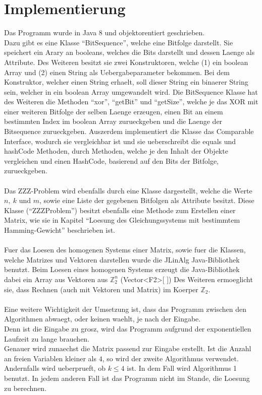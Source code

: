\documentclass[a4paper,10pt,ngerman]{scrartcl}
\begin{document}
{\section{Implementierung}
Das Programm wurde in Java 8 und objektorentiert geschrieben.
\\ Dazu gibt es eine Klasse "`BitSequence"', welche eine Bitfolge darstellt. Sie speichert ein Arary an booleans, welches die Bits darstellt und dessen Laenge als Attribute. 
Des Weiteren besitzt sie zwei Konstruktoren, welche (1) ein boolean Array und (2) einen String als Uebergabeparameter bekommen. Bei dem Konstruktor, welcher einen String erhaelt, soll dieser String ein binaerer String sein, welcher in ein boolean Array umgewandelt wird.
Die BitSequence Klasse hat des Weiteren die Methoden "`xor"', "`getBit"' und "`getSize"', welche je das XOR mit einer weiteren Bitfolge der selben Laenge erzeugen, einen Bit an einem bestimmten Index im boolean Array zurueckgeben und die Laenge der Bitsequence zurueckgeben. Auszerdem implementiert die Klasse das Comparable Interface, wodurch sie vergleichbar ist und sie ueberschreibt die equals und hashCode Methoden, durch Methoden, welche je den Inhalt der Objekte vergleichen und einen HashCode, basierend auf den Bits der Bitfolge, zurueckgeben.
\\\\
Das ZZZ-Problem wird ebenfalls durch eine Klasse dargestellt, welche die Werte $n, \ k$ und $m$, sowie eine Liste der gegebenen Bitfolgen als Attribute besitzt. Diese Klasse ("`ZZZProblem"') besitzt ebenfalls eine Methode zum Erstellen einer Matrix, wie sie in Kapitel "`Loesung des Gleichungssystems mit bestimmtem Hamming-Gewicht"' beschrieben ist.
\\\\
Fuer das Loesen des homogenen Systems einer Matrix, sowie fuer die Klassen, welche Matrizes und Vektoren darstellen wurde die JLinAlg Java-Bibliothek benutzt. 
Beim Loesen eines homogenen Systems erzeugt die Java-Bibliothek dabei ein Array aus Vektoren aus \(\mathbb{Z}_{2}^n\) (Vector<F2>[ ])
Des Weiteren ermoeglicht sie, dass Rechnen (auch mit Vektoren und Matrix) im Koerper \(\mathbb{Z}_{2}\). 
\\\\
Eine weitere Wichtigkeit der Umsetzung ist, dass das Programm zwischen den Algorithmen abwaegt, oder keinen waehlt, je nach der Eingabe.\\
Denn ist die Eingabe zu grosz, wird das Programm aufgrund der exponentiellen Laufzeit zu lange brauchen. \\
Genauer wird zunaechst die Matrix passend zur Eingabe erstellt. Ist die Anzahl an freien Variablen kleiner als $4$, so wird der zweite Algorithmus verwendet. Andernfalls wird ueberprueft, ob $k \leq 4$ ist. In dem Fall wird Algorithmus 1 benutzt.
In jedem anderen Fall ist das Programm nicht im Stande, die Loesung zu berechnen.

}
\end{document}

